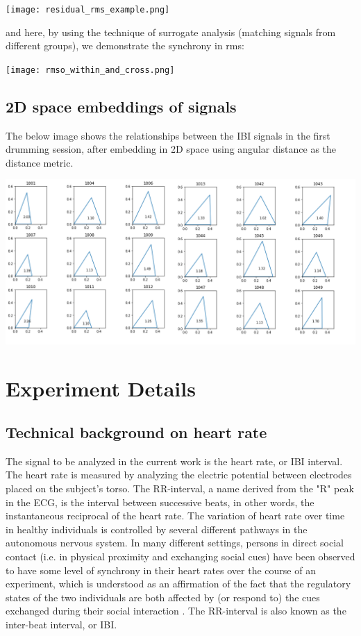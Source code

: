 \documentclass[a4paper, 11pt]{report}      %
\begin{document}
\texttt{[image: residual\_rms\_example.png]}

and here, by using the technique of surrogate analysis (matching signals from different groups), we demonstrate the synchrony in rms:

\texttt{[image: rmso\_within\_and\_cross.png]}

\section {2D space embeddings of signals}

The below image shows the relationships between the IBI signals in the first drumming session, after embedding in 2D space using angular distance as the distance metric.

\vspace{1cm}

\includegraphics[scale=0.35]{triangles_coupling_modes_landscape.png}


\appendix
\chapter{Experiment Details}
\section{Technical background on heart rate}
The signal to be analyzed in the current work is the heart rate, or IBI interval. 
The heart rate is measured by analyzing the electric potential between electrodes placed on the subject's torso. The RR-interval, a name derived from the "R" peak in the ECG, is the interval between successive beats, in other words, the instantaneous reciprocal of the heart rate. The variation of heart rate over time in healthy individuals is controlled by several different pathways in the autonomous nervous system. In many different settings, persons in direct social contact (i.e. in physical proximity and exchanging social cues) have been observed to have some level of synchrony in their heart rates over the course of an experiment, which is understood as an affirmation of the fact that the regulatory states of the two individuals are both affected by (or respond to) the cues exchanged during their social interaction \citep{palumbo2017interpersonal}.
The RR-interval is also known as the inter-beat interval, or IBI.
\end{document}
